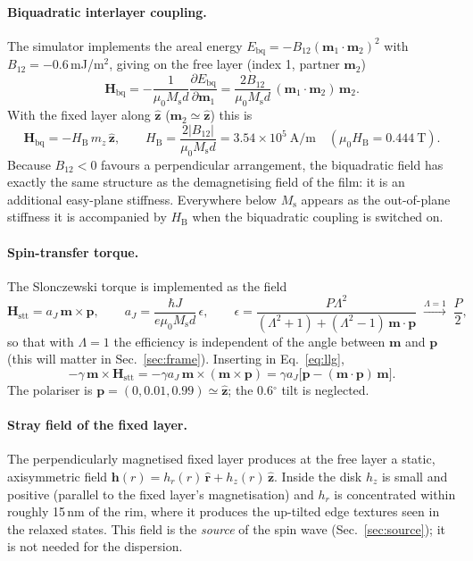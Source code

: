 \documentclass[11pt,a4paper]{article}
\newcommand{\vect}[1]{\mathbf{#1}}
\newcommand{\uv}[1]{\hat{\mathbf{#1}}}
\newcommand{\Ms}{M_\mathrm{s}}
\newcommand{\HB}{H_\mathrm{B}}
\begin{document}
\paragraph{Biquadratic interlayer coupling.}
The simulator implements the areal energy $E_\mathrm{bq}=-B_{12}(\vect m_1\cdot\vect m_2)^2$ with
$B_{12}=-0.6$\,mJ/m$^2$, giving on the free layer (index 1, partner $\vect m_2$)
\begin{equation}
\vect H_\mathrm{bq}=-\frac{1}{\mu_0\Ms d}\frac{\partial E_\mathrm{bq}}{\partial\vect m_1}
=\frac{2B_{12}}{\mu_0\Ms d}\,(\vect m_1\cdot\vect m_2)\,\vect m_2 .
\end{equation}
With the fixed layer along $\uv z$ ($\vect m_2\simeq\uv z$) this is
\begin{equation}
\vect H_\mathrm{bq}=-\HB\,m_z\,\uv z,\qquad
\HB=\frac{2|B_{12}|}{\mu_0\Ms d}=3.54\times10^{5}\ \mathrm{A/m}\quad(\mu_0\HB=0.444\ \mathrm{T}).
\label{eq:HB}
\end{equation}
Because $B_{12}<0$ favours a perpendicular arrangement, the biquadratic field has exactly the same structure as
the demagnetising field of the film: it is an additional easy-plane stiffness.  Everywhere below $\Ms$ appears
as the out-of-plane stiffness it is accompanied by $\HB$ when the biquadratic coupling is switched on.

\paragraph{Spin-transfer torque.}
The Slonczewski torque is implemented as the field
\begin{equation}
\vect H_\mathrm{stt}=a_J\,\vect m\times\vect p,\qquad
a_J=\frac{\hbar J}{e\mu_0\Ms d}\,\epsilon,\qquad
\epsilon=\frac{P\Lambda^2}{(\Lambda^2+1)+(\Lambda^2-1)\,\vect m\cdot\vect p}\;\xrightarrow{\Lambda=1}\;\frac{P}{2},
\end{equation}
so that with $\Lambda=1$ the efficiency is independent of the angle between $\vect m$ and $\vect p$
(this will matter in Sec.~\ref{sec:frame}).  Inserting in Eq.~\eqref{eq:llg},
\begin{equation}
-\gamma\,\vect m\times\vect H_\mathrm{stt}=-\gamma a_J\,\vect m\times(\vect m\times\vect p)
=\gamma a_J\big[\vect p-(\vect m\cdot\vect p)\,\vect m\big].
\label{eq:stt}
\end{equation}
The polariser is $\vect p=(0,0.01,0.99)\simeq\uv z$; the 0.6$^\circ$ tilt is neglected.

\paragraph{Stray field of the fixed layer.}
The perpendicularly magnetised fixed layer produces at the free layer a static, axisymmetric field
$\vect h(r)=h_r(r)\,\uv r+h_z(r)\,\uv z$.  Inside the disk $h_z$ is small and positive (parallel to the fixed
layer's magnetisation) and $h_r$ is concentrated within roughly 15\,nm of the rim, where it produces the
up-tilted edge textures seen in the relaxed states.  This field is the \emph{source} of the spin wave
(Sec.~\ref{sec:source}); it is not needed for the dispersion.
\end{document}
